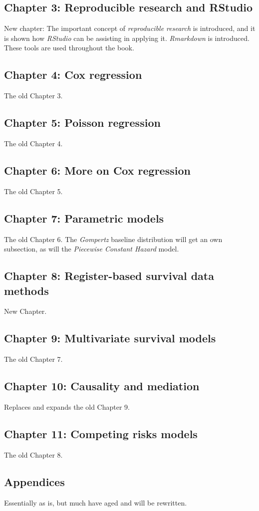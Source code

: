 \documentclass[a4paper,11pt]{article}
\begin{document}
\subsection*{Chapter 3: Reproducible research and RStudio}

New chapter: The important concept of \emph{reproducible research} is
introduced, and it is shown how \emph{RStudio} can be assisting in applying
it. \emph{Rmarkdown} is introduced. These tools are used throughout the
book.

\subsection*{Chapter 4: Cox regression}

The old Chapter 3.

\subsection*{Chapter 5: Poisson regression}

The old Chapter 4.

\subsection*{Chapter 6: More on Cox regression}

The old Chapter 5.

\subsection*{Chapter 7: Parametric models}

The old Chapter 6. The \emph{Gompertz} baseline distribution will get an
own subsection, as will the \emph{Piecewise Constant Hazard} model.

\subsection*{Chapter 8: Register-based survival data methods}

New Chapter.

\subsection*{Chapter 9: Multivariate survival models}

The old Chapter 7.

\subsection*{Chapter 10: Causality and mediation}

Replaces and expands the old Chapter 9.

\subsection*{Chapter 11: Competing risks models}

The old Chapter 8.

\subsection*{Appendices}

Essentially as is, but much have aged and will be rewritten.


\end{document}
